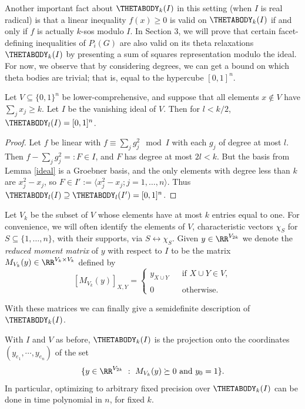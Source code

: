 Another important fact about $\THETABODY_k(I)$ in this setting (when $I$ is real radical) is that a linear inequality $f(x) \geq 0$ is valid on $\THETABODY_k(I)$ if and only if $f$ is actually $k$-sos modulo $I$.
In Section 3, we will prove that certain facet-defining inequalities of $P_i(G)$ are also valid on its theta relaxations $\THETABODY_k(I)$ by presenting a sum of squares representation modulo the ideal. For now, we observe that by considering degrees, we can get a bound on which theta bodies are trivial; that is, equal to the hypercube $[0,1]^n$.

\begin{lemma} \label{lowerbound}
Let $V \subseteq \{0,1\}^n$ be lower-comprehensive, and suppose that all elements $x
\notin V$ have $\sum_j x_j \ge k$. Let $I$ be the vanishing ideal of $V$. Then 
for $l < k/2$, $\THETABODY_l(I) = [0,1]^n$.
\end{lemma}
\begin{proof}
Let $f$ be linear with $f \equiv \sum_j g_j^2 \mod I$ with each $g_j$ of degree
at most $l$. Then $f - \sum_j g_j^2 =: F \in I$, and $F$ has degree at most $2l
< k$. But the basis from Lemma \ref{ideal} is a Groebner basis, and the only
elements with degree less than $k$ are $x_j^2 - x_j$, so $F \in I' := \langle x_j^2 - x_j ;j = 1, \ldots, n\rangle$. Thus $\THETABODY_l(I) \supseteq \THETABODY_l(I') = [0,1]^n$.
\end{proof}


Let $V_k$ be the subset of $V$ whose elements have at most $k$ entries equal to one. For convenience, we will often identify the elements of $V$, characteristic vectors $\chi_S$ for $S \subseteq \{1,\ldots,n\}$, with their supports, via $S \leftrightarrow \chi_S$. Given $y \in \RR^{V_{2k}}$ we denote the {\em reduced 
moment matrix} of $y$ with respect to $I$ to be the matrix $M_{V_k}(y) \in \RR^{V_k \times V_k}$ defined by 
$$[M_{V_k}(y)]_{X,Y}=
\left\{  
\begin{array}{ll} 
y_{X \cup Y} & \ \ \textrm{ if } X \cup Y \in V, \\
\\
0            & \ \ \textrm{ otherwise. }   
\end{array} 
\right.$$

With these matrices we can finally give a semidefinite description of $\THETABODY_k(I)$.

\begin{proposition}
With $I$ and $V$ as before, $\THETABODY_k(I)$ is the projection onto the coordinates $(y_{e_1}, \cdots, y_{e_n})$ of the set
$$\{y \in \RR^{V_{2k}}\ : \ M_{V_k}(y) \succeq 0 \textrm{ and } y_{0}=1\}.$$
In particular, optimizing to arbitrary fixed precision over $\THETABODY_k(I)$
can be done in time polynomial in $n$, for fixed $k$.
\end{proposition}

